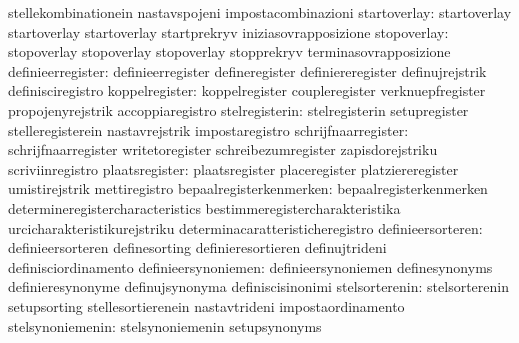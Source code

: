                                   stellekombinationein             nastavspojeni
                                  impostacombinazioni
                    startoverlay: startoverlay                     startoverlay
                                  startoverlay                     startprekryv
                                  iniziasovrapposizione
                     stopoverlay: stopoverlay                      stopoverlay
                                  stopoverlay                      stopprekryv
                                  terminasovrapposizione
               definieerregister: definieerregister                defineregister
                                  definiereregister                definujrejstrik
                                  definisciregistro
                  koppelregister: koppelregister                   coupleregister
                                  verknuepfregister                propojenyrejstrik
                                  accoppiaregistro
                  stelregisterin: stelregisterin                   setupregister
                                  stelleregisterein                nastavrejstrik
                                  impostaregistro
             schrijfnaarregister: schrijfnaarregister              writetoregister
                                  schreibezumregister              zapisdorejstriku
                                  scriviinregistro
                  plaatsregister: plaatsregister                   placeregister
                                  platziereregister                umistirejstrik
                                  mettiregistro
         bepaalregisterkenmerken: bepaalregisterkenmerken          determineregistercharacteristics
                                  bestimmeregistercharakteristika  urcicharakteristikurejstriku
                                  determinacaratteristicheregistro
               definieersorteren: definieersorteren                definesorting
                                  definieresortieren               definujtrideni
                                  definisciordinamento
             definieersynoniemen: definieersynoniemen              definesynonyms
                                  definieresynonyme                definujsynonyma
                                  definiscisinonimi
                  stelsorterenin: stelsorterenin                   setupsorting
                                  stellesortierenein               nastavtrideni
                                  impostaordinamento
                stelsynoniemenin: stelsynoniemenin                 setupsynonyms
